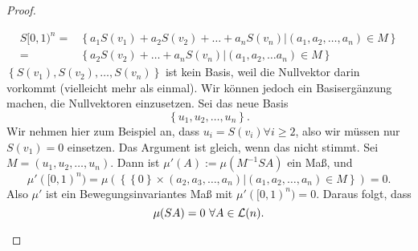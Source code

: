 \begin{proof}
\begin{parts}
\begin{align*}
		S[0,1)^n=&\left\{ a_1S(v_1)+a_2S(v_2)+\dots +a_nS(v_n)|(a_1,a_2,\dots, a_n)\in M \right\}\\
		=&\left\{ a_2S(v_2)+\dots+a_nS(v_n)|(a_1,a_2,\dots a_n)\in M \right\} 
\end{align*}
	$\left\{ S(v_1),S(v_2),\dots, S(v_n) \right\}$ ist kein Basis, weil die Nullvektor darin vorkommt (vielleicht mehr als einmal). Wir können jedoch ein Basisergänzung machen, die Nullvektoren einzusetzen. Sei das neue Basis
	\[
	\left\{ u_1,u_2,\dots, u_n \right\} 
	.\] 
	Wir nehmen hier zum Beispiel an, dass $u_i=S(v_i)\forall i\ge 2$, also wir müssen nur $S(v_1)=0$ einsetzen. Das Argument ist gleich, wenn das nicht stimmt. Sei $M=(u_1,u_2,\dots, u_n)$. Dann ist $\mu'(A):=\mu(M^{-1}SA)$ ein Maß, und
	\[
		\mu'([0,1)^n)=\mu(\left\{\left\{ 0 \right\} \times (a_2,a_3,\dots, a_n)|(a_1,a_2,\dots, a_n)\in M\right\})=0
	.\] 
	Also $\mu'$ ist ein Bewegungsinvariantes Maß mit $\mu'([0,1)^n)=0$. Daraus folgt, dass
	\[
	\mu(SA)=0~\forall A\in \mathcal{L}(n)
	.\qedhere\] 
\end{parts}	
\end{proof}
